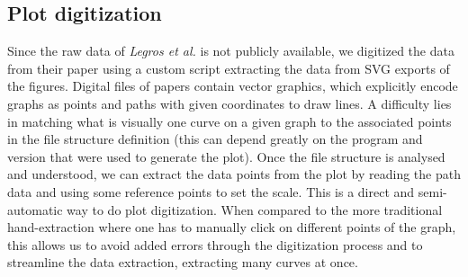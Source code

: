 \subsection{Plot digitization}
Since the raw data of \textit{Legros et al.} is not publicly available, 
we digitized the data from their paper using a custom script extracting the data from SVG exports of the figures. 
Digital files of papers contain vector graphics, 
which explicitly encode graphs as points and paths with given coordinates to draw lines. 
A difficulty lies in matching what is visually one curve on a given graph to the associated points in the file structure definition 
(this can depend greatly on the program and version that were used to generate the plot). 
Once the file structure is analysed and understood, 
we can extract the data points from the plot by reading the path data and using some reference points to set the scale.
This is a direct and semi-automatic way to do plot digitization. 
When compared to the more traditional hand-extraction where one has to manually click on different points of the graph, 
this allows us to avoid added errors through the digitization process 
and to streamline the data extraction, extracting many curves at once.
